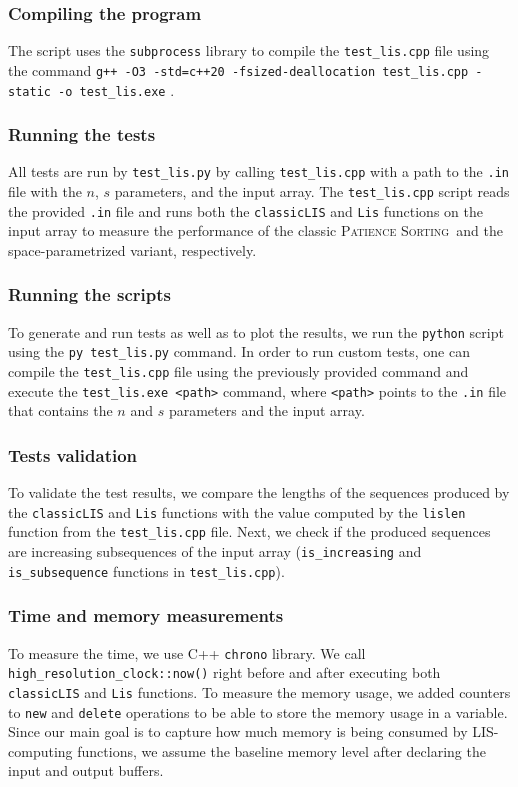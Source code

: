 \documentclass[lic, english, shortabstract]{iithesis}
\theoremstyle{plain}
\newcommand{\Psort}{\textsc{Patience Sorting}}
\theoremstyle{definition}
\begin{document}
\subsubsection{Compiling the program}
The script uses the \texttt{subprocess} library to compile the \texttt{test\_lis.cpp} file using the command \texttt{g++ -O3 -std=c++20 -fsized-deallocation test\_lis.cpp -static -o test\_lis.exe} .

\subsubsection{Running the tests}
All tests are run by \texttt{test\_lis.py} by calling \texttt{test\_lis.cpp} with a path to the \texttt{.in} file with the $n$, $s$ parameters, and the input array.
The \texttt{test\_lis.cpp} script reads the provided \texttt{.in} file and runs both the \texttt{classicLIS} and \texttt{Lis} functions on the input array to measure the performance of the classic \Psort\ and the space-parametrized variant, respectively.

\subsubsection{Running the scripts}
To generate and run tests as well as to plot the results, we run the \texttt{python} script using the \texttt{py test\_lis.py} command. 
In order to run custom tests, one can compile the \texttt{test\_lis.cpp} file using the previously provided command and execute the \texttt{test\_lis.exe <path>} command, where \texttt{<path>} points to the \texttt{.in} file that contains the $n$ and $s$ parameters and the input array.

\subsubsection{Tests validation}
To validate the test results, we compare the lengths of the sequences produced by the \texttt{classicLIS} and \texttt{Lis} functions with the value computed by the \texttt{lislen} function from the \texttt{test\_lis.cpp} file.
Next, we check if the produced sequences are increasing subsequences of the input array (\texttt{is\_increasing} and \texttt{is\_subsequence} functions in \texttt{test\_lis.cpp}).

\subsubsection{Time and memory measurements}
To measure the time, we use C++ \texttt{chrono} library. We call \texttt{high\_resolution\_clock::now()} right before and after executing both \texttt{classicLIS} and \texttt{Lis} functions.
To measure the memory usage, we added counters to \texttt{new} and \texttt{delete} operations to be able to store the memory usage in a variable.
Since our main goal is to capture how much memory is being consumed by LIS-computing functions, we assume the baseline memory level after declaring the input and output buffers.
\end{document}
